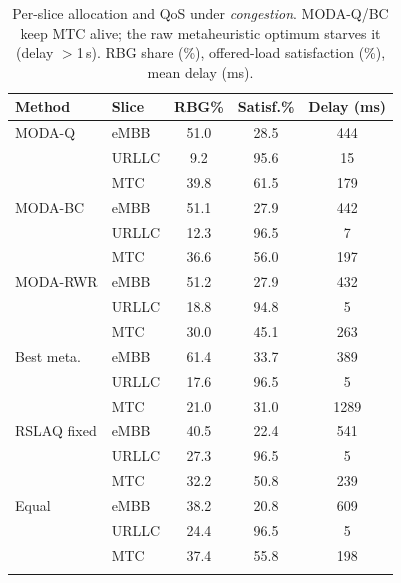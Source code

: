 \begin{table}[t]
\centering
\caption{Per-slice allocation and QoS under \emph{congestion}. MODA-Q/BC keep MTC alive; the raw metaheuristic optimum starves it (delay $>$1\,s). RBG share (\%), offered-load satisfaction (\%), mean delay (ms).}
\label{tab:moda_congestion}
\begin{tabular}{llccc}
\toprule
Method & Slice & RBG\% & Satisf.\% & Delay (ms) \\
\midrule
MODA-Q & eMBB & 51.0 & 28.5 & 444 \\
 & URLLC & 9.2 & 95.6 & 15 \\
 & MTC & 39.8 & 61.5 & 179 \\
\addlinespace[2pt]
MODA-BC & eMBB & 51.1 & 27.9 & 442 \\
 & URLLC & 12.3 & 96.5 & 7 \\
 & MTC & 36.6 & 56.0 & 197 \\
\addlinespace[2pt]
MODA-RWR & eMBB & 51.2 & 27.9 & 432 \\
 & URLLC & 18.8 & 94.8 & 5 \\
 & MTC & 30.0 & 45.1 & 263 \\
\addlinespace[2pt]
Best meta. & eMBB & 61.4 & 33.7 & 389 \\
 & URLLC & 17.6 & 96.5 & 5 \\
 & MTC & 21.0 & 31.0 & 1289 \\
\addlinespace[2pt]
RSLAQ fixed & eMBB & 40.5 & 22.4 & 541 \\
 & URLLC & 27.3 & 96.5 & 5 \\
 & MTC & 32.2 & 50.8 & 239 \\
\addlinespace[2pt]
Equal & eMBB & 38.2 & 20.8 & 609 \\
 & URLLC & 24.4 & 96.5 & 5 \\
 & MTC & 37.4 & 55.8 & 198 \\
\addlinespace[2pt]
\bottomrule
\end{tabular}
\end{table}
